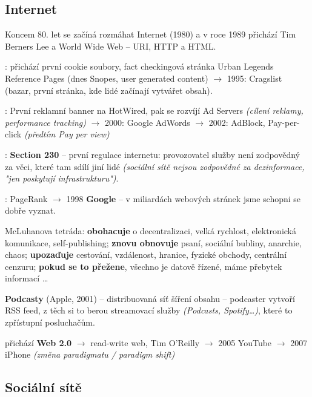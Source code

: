 \subsection{Internet}

Koncem 80. let se začíná rozmáhat Internet (1980) a v roce 1989 přichází Tim Berners Lee a World Wide Web -- URI, HTTP a HTML.

\vspace{4pt}
: přichází první cookie soubory, fact checkingová stránka Urban Legends Reference Pages (dnes Snopes, user generated content) $\to$ 1995: Cragslist (bazar, první stránka, kde lidé začínají vytvářet obsah).

\vspace{4pt}
: První reklamní banner na HotWired, pak se rozvíjí Ad Servers \textit{(cílení reklamy, performance tracking)} $\to$ 2000: Google AdWords $\to$ 2002: AdBlock, Pay-per-click \textit{(předtím Pay per view)}

\vspace{4pt}
: \textbf{Section 230} -- první regulace internetu: provozovatel služby není zodpovědný za věci, které tam sdílí jiní lidé \textit{(sociální sítě nejsou zodpovědné za dezinformace, "jen poskytují infrastrukturu")}.

\vspace{4pt}
: PageRank $\to$ 1998 \textbf{Google} -- v miliardách webových stránek jsme schopni se dobře vyznat.

\vspace{4pt}
\noindent McLuhanova tetráda: \textbf{obohacuje} o decentralizaci, velká rychlost, elektronická komunikace, self-publishing; \textbf{znovu obnovuje} psaní, sociální bubliny, anarchie, chaos; \textbf{upozaďuje} cestování, vzdálenost, hranice, fyzické obchody, centrální cenzuru; \textbf{pokud se to přežene}, všechno je datově řízené, máme přebytek informací \ldots

\vspace{4pt}
\noindent \textbf{Podcasty} (Apple, 2001) -- distribuovaná síť šíření obsahu -- podcaster vytvoří RSS feed, z těch si to berou streamovací služby \textit{(Podcasts, Spotify\ldots)}, které to zpřístupní posluchačům.

\vspace{4pt}
 přichází \textbf{Web 2.0} $\to$ read-write web, Tim O'Reilly $\to$ 2005 YouTube $\to$ 2007 iPhone \textit{(změna paradigmatu / paradigm shift)}

\subsection{Sociální sítě}

